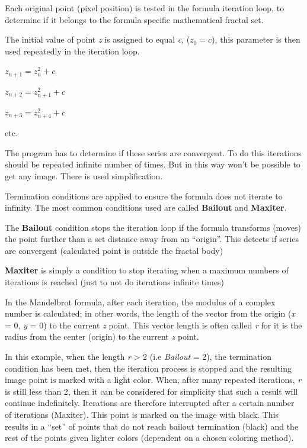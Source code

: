 Each original point (pixel position) is tested in the formula iteration loop, to
determine if it belongs to the formula specific mathematical fractal set.

The initial value of point \emph{z} is assigned to equal \emph{c}, ($ z_{0} = c
$), this parameter is then used repeatedly in the iteration loop.

\(z_{n + 1} = z_{n}^{2} + c\)

\(z_{n + 2} = z_{n + 1}^{2} + c\)

\(z_{n + 3} = z_{n + 4}^{2} + c\)

etc.

The program has to determine if these series are convergent. To do this
iterations should be repeated infinite number of times. But in this way won't be
possible to get any image. There is used simplification.

Termination conditions are applied to ensure the formula does not iterate to
infinity. The most common conditions used are called \textbf{Bailout} and
\textbf{Maxiter}.

\label{bailout-maxiter}The \textbf{Bailout} condition stops the iteration loop if the formula
transforms (moves) the point further than a set distance away from an
``origin''. This detects if series are convergent (calculated point is outside
the fractal body)

\textbf{Maxiter} is simply a condition to stop iterating when a maximum numbers
of iterations is reached (just to not do iterations infinite times)

In the Mandelbrot formula, after each iteration, the modulus of a complex number
is calculated; in other words, the length of the vector from the origin
(\emph{x} = 0, \emph{y} = 0) to the current \emph{z} point. This vector length
is often called \emph{r} for it is the radius from the center (origin) to the
current \emph{z} point.

In this example, when the length \emph{r} \textgreater{} 2 (i.e \emph{Bailout} =
2), the termination condition has been met, then the iteration process is
stopped and the resulting image point is marked with a light color. When, after
many repeated iterations, \emph{r} is still less than 2, then it can be
considered for simplicity that such a result will continue indefinitely.
Iterations are therefore interrupted after a certain number of iterations
(Maxiter). This point is marked on the image with black. This results in a
``set'' of points that do not reach bailout termination (black) and the rest of
the points given lighter colors (dependent on a chosen coloring method).

